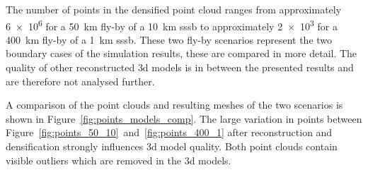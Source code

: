 The number of points in the densified point cloud ranges from approximately \SI{6e6}{} for a \SI{50}{\kilo\meter} fly-by of a \SI{10}{\kilo\meter} \gls{sssb} to approximately \SI{2e3}{} for a \SI{400}{\kilo\meter} fly-by of a \SI{1}{\kilo\meter} \gls{sssb}. These two fly-by scenarios represent the two boundary cases of the simulation results, these are compared in more detail. The quality of other reconstructed \gls{3d} models is in between the presented results and are therefore not analysed further.

A comparison of the point clouds and resulting meshes of the two scenarios is shown in Figure~\ref{fig:points_models_comp}. The large variation in points between Figure~\ref{fig:points_50_10}~and~\ref{fig:points_400_1} after reconstruction and densification strongly influences \gls{3d} model quality. Both point clouds contain visible outliers which are removed in the \gls{3d} models.
